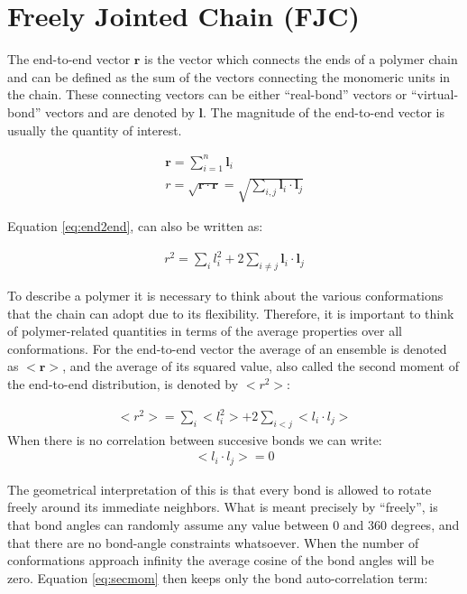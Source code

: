 \section{Freely Jointed Chain (FJC)}
The end-to-end  vector $\mathbf{r}$ is  the vector which  connects the
ends of a polymer  chain and can be defined as the  sum of the vectors
connecting the monomeric units  in the chain. These connecting vectors
can be  either ``real-bond''  vectors or ``virtual-bond''  vectors and
are denoted  by $\mathbf{l}$.  The magnitude of  the end-to-end vector
is usually the quantity of interest.

\begin{gather}
\label{eq:e2e}
\mathbf{r} = \sum_{i=1}^{n} \mathbf{l}_{i}\\
\label{eq:end2end}
r = \sqrt{\mathbf{r} \cdot \mathbf{r}}
  = \sqrt{\sum_{i,j}\mathbf{l}_{i} \cdot \mathbf{l}_{j}}
\end{gather}

Equation \ref{eq:end2end}, can also be written as:

\begin{gather}
r^2 = \sum_{i}l_{i}^{2} + 2 \sum_{i\neq j} \mathbf{l}_{i} \cdot \mathbf{l}_{j}
\end{gather}  

To  describe a  polymer it  is necessary  to think  about  the various
conformations    that   the    chain    can   adopt    due   to    its
flexibility. Therefore,  it is  important to think  of polymer-related
quantities   in   terms   of   the   average   properties   over   all
conformations. For the end-to-end vector the average of an ensemble is
denoted as $<\mathbf{r}>$, and the  average of its squared value, also
called the second moment of the end-to-end distribution, is denoted by
$<r^2>$:

\begin{gather}
\label{eq:secmom}  
<r^2>=\sum_{i}<l_{i}^2> + 2\sum_{i<j}<l_{i} \cdot l_{j}>
\end{gather}  
When there is no correlation between succesive bonds we can write:
\begin{gather}
\label{eq:nocorr}
<l_{i} \cdot l_{j}> = 0
\end{gather}

The geometrical interpretation  of this is that every  bond is allowed
to  rotate  freely around  its  immediate  neighbors.   What is  meant
precisely by ``freely'',  is that bond angles can  randomly assume any
value  between 0 and  360 degrees,  and that  there are  no bond-angle
constraints  whatsoever.  When  the number  of  conformations approach
infinity the average cosine of the bond angles will be zero.  Equation
\ref{eq:secmom} then keeps only the bond auto-correlation term:

